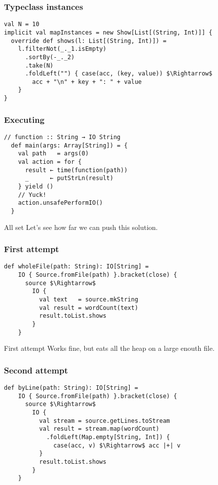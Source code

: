 \documentclass{beamer}
\begin{document}
\begin{frame}[fragile]
\frametitle{Typeclass instances}
\begin{lstlisting}[mathescape]
val N = 10
implicit val mapInstances = new Show[List[(String, Int)]] {
  override def shows(l: List[(String, Int)]) =
    l.filterNot(_._1.isEmpty)
      .sortBy(-_._2)
      .take(N)
      .foldLeft("") { case(acc, (key, value)) $\Rightarrow$
        acc + "\n" + key + ": " + value
    }
}
\end{lstlisting}
\end{frame}

\begin{frame}[fragile]
\frametitle{Executing}
\begin{lstlisting}[mathescape]
  // function :: String → IO String
  def main(args: Array[String]) = {
    val path   = args(0)
    val action = for {
      result ← time(function(path))
      _      ← putStrLn(result)
    } yield ()
    // Yuck!
    action.unsafePerformIO()
  }
\end{lstlisting}
\end{frame}

\begin{frame}{All set}
  Let's see how far we can push this solution.
\end{frame}

\begin{frame}[fragile]
\frametitle{First attempt}
\begin{lstlisting}[mathescape]
  def wholeFile(path: String): IO[String] =
    IO { Source.fromFile(path) }.bracket(close) {
      source $\Rightarrow$
        IO {
          val text   = source.mkString
          val result = wordCount(text)
          result.toList.shows
        }
    }
\end{lstlisting}
\end{frame}

\begin{frame}{First attempt}
  Works fine, but eats all the heap on a large enouth file.
\end{frame}

\begin{frame}[fragile]
\frametitle{Second attempt}
\begin{lstlisting}[mathescape]
  def byLine(path: String): IO[String] =
    IO { Source.fromFile(path) }.bracket(close) {
      source $\Rightarrow$
        IO {
          val stream = source.getLines.toStream
          val result = stream.map(wordCount)
            .foldLeft(Map.empty[String, Int]) {
              case(acc, v) $\Rightarrow$ acc |+| v
          }
          result.toList.shows
        }
    }
\end{lstlisting}
\end{frame}
\end{document}
